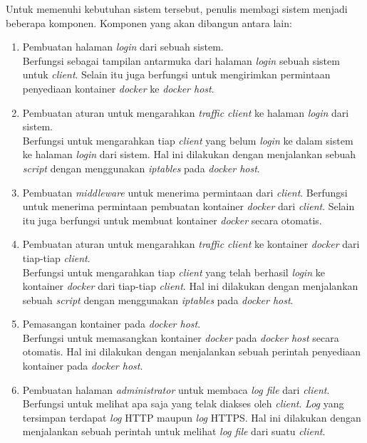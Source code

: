 \indent Untuk memenuhi kebutuhan sistem tersebut, penulis membagi sistem menjadi beberapa komponen. Komponen yang akan dibangun antara lain: 
\begin{enumerate} 
	\item Pembuatan halaman \textit{login} dari sebuah sistem.\\
	Berfungsi sebagai tampilan antarmuka dari halaman \textit{login} sebuah sistem untuk \textit{client}. Selain itu juga berfungsi untuk mengirimkan permintaan penyediaan kontainer \textit{docker} ke \textit{docker host}.
	\item Pembuatan aturan untuk mengarahkan \textit{traffic client} ke halaman \textit{login} dari sistem.\\
	Berfungsi untuk mengarahkan tiap \textit{client} yang belum \textit{login} ke dalam sistem ke halaman \textit{login} dari sistem. Hal ini dilakukan dengan menjalankan sebuah \textit{script} dengan menggunakan \textit{iptables} pada \textit{docker host}.
	\item Pembuatan \textit{middleware} untuk menerima permintaan dari \textit{client}.
	Berfungsi untuk menerima permintaan pembuatan kontainer \textit{docker} dari \textit{client}. Selain itu juga berfungsi untuk membuat kontainer \textit{docker} secara otomatis.
	\item Pembuatan aturan untuk mengarahkan \textit{traffic client} ke kontainer \textit{docker} dari tiap-tiap \textit{client}.\\
	Berfungsi untuk mengarahkan tiap \textit{client} yang telah berhasil \textit{login} ke kontainer \textit{docker} dari tiap-tiap \textit{client}. Hal ini dilakukan dengan menjalankan sebuah \textit{script} dengan menggunakan \textit{iptables} pada \textit{docker host}.
	\item Pemasangan kontainer pada \textit{docker host}.\\
	Berfungsi untuk memasangkan kontainer \textit{docker} pada \textit{docker host} secara otomatis. Hal ini dilakukan dengan menjalankan sebuah perintah penyediaan kontainer pada \textit{docker host}.
	\item Pembuatan halaman \textit{administrator} untuk membaca \textit{log file} dari \textit{client}.\\
	Berfungsi untuk melihat apa saja yang telak diakses oleh \textit{client}. \textit{Log} yang tersimpan terdapat \textit{log} HTTP maupun \textit{log} HTTPS.  Hal ini dilakukan dengan menjalankan sebuah perintah untuk melihat \textit{log file} dari suatu \textit{client}.
	
\end{enumerate}

